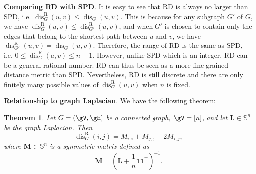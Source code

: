 \documentclass{article} %
\newtheorem{theorem}{Theorem}[section]
\newcommand*{\dis}{{\operatorname{dis}}}
\newcommand*{\disR}{\operatorname{dis}^\mathrm{R}}
\begin{document}
\textbf{Comparing RD with SPD}. It is easy to see that RD is always no larger than SPD, i.e. $\disR_G(u,v)\le \dis_G(u,v)$. This is because for any subgraph $G'$ of $G$, we have $\disR_G(u,v)\le \disR_{G'}(u,v)$, and when $G'$ is chosen to contain only the edges that belong to the shortest path between $u$ and $v$, we have $\disR_{G'}(u,v)= \dis_{G}(u,v)$. Therefore, the range of RD is the same as SPD, i.e. $0\le\disR_G(u,v)\le n-1$. However, unlike SPD which is an integer, RD can be a general rational number. RD can thus be seen as a more fine-grained distance metric than SPD. Nevertheless, RD is still discrete and there are only finitely many possible values of $\disR_G(u,v)$ when $n$ is fixed.

\textbf{Relationship to graph Laplacian}. We have the following theorem:
\begin{theorem}
\label{thm:resiatnce_and_laplacian}
Let $G=(\gV,\gE)$ be a connected graph, $\gV=[n]$, and let $\mathbf L\in\mathbb S^{n}$ be the graph Laplacian. Then $$\disR_G(i,j)=M_{i,i}+M_{j,j}-2M_{i,j},$$ where $\mathbf M\in\mathbb S^n$ is a symmetric matrix defined as $$\mathbf M=\left(\mathbf L+\frac 1 n \mathbf 1\mathbf 1^\top\right)^{-1}.$$
\end{theorem}
\end{document}

